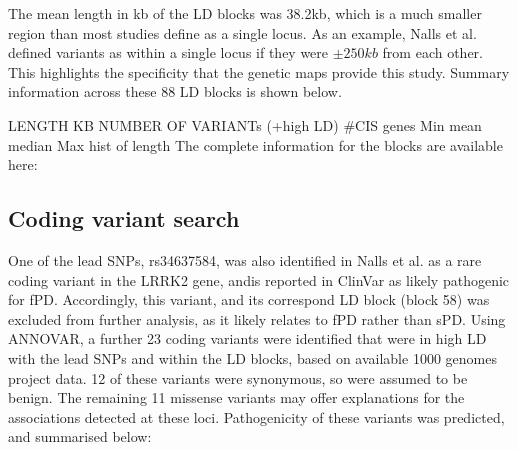 \documentclass{article}
\begin{document}
The mean length in kb of the LD blocks was 38.2kb, which is a much smaller region than most studies define as a single locus. As an example, Nalls et al.\cite{Nalls2019IdentificationStudies} defined variants as within a single locus if they were $\pm 250kb$ from each other. This highlights the specificity that the genetic maps provide this study.
Summary information across these 88 LD blocks is shown below.

LENGTH KB  NUMBER OF VARIANTs (+high LD)  #CIS genes
Min
mean
median
Max
hist of length
The complete information for the blocks are available here:


\newpage
\subsection{Coding variant search}
One of the lead SNPs, rs34637584, was also identified in Nalls et al.\cite{Nalls2019IdentificationStudies} as a rare coding variant in the LRRK2 gene, andis reported in ClinVar as likely pathogenic for fPD. Accordingly, this variant, and its correspond LD block (block 58) was excluded from further analysis, as it likely relates to fPD rather than sPD. Using ANNOVAR\cite{Wang2010ANNOVAR:Data}, a further 23 coding variants were identified that were in high LD with the lead SNPs and within the LD blocks, based on available 1000 genomes project data. 12 of these variants were synonymous, so were assumed to be benign. The remaining 11 missense variants may offer explanations for the associations detected at these loci. Pathogenicity of these variants was predicted, and summarised below:
\end{document}
